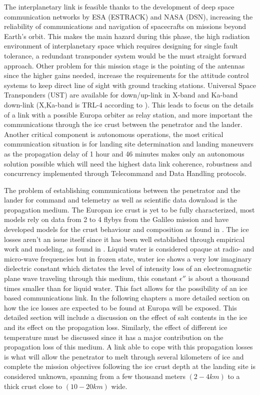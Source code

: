 The interplanetary link is feasible thanks to the development of deep space communication networks by ESA (ESTRACK) and NASA (DSN), increasing the reliability of communications and navigation of spacecrafts on missions beyond Earth's orbit. This makes the main hazard during this phase, the high radiation environment of interplanetary space which requires designing for single fault tolerance, a redundant transponder system would be the must straight forward approach. Other problem for this mission stage is the pointing of the antennas since the higher gains needed, increase the requirements for the attitude control systems to keep direct line of sight with ground tracking stations. Universal Space Transponders (UST) are available for down/up-link in X-band and Ka-band down-link (X,Ka-band is TRL-4 according to \cite{clipper}). This leads to focus on the details of a link with a possible Europa orbiter as relay station, and more important the communications through the ice crust between the penetrator and the lander. Another critical component is autonomous operations, the most critical communication situation is for landing site determination and landing maneuvers as the propagation delay of 1 hour and 46 minutes makes only an autonomous solution possible which will need the highest data link coherence, robustness and concurrency implemented through Telecommand and Data Handling protocols.

The problem of establishing communications between the penetrator and the lander for command and telemetry as well as scientific data download is the propagation medium. The Europan ice crust is yet to be fully characterized, most models rely on data from 2 to 4 flybys from the Galileo mission and have developed models for the crust behaviour and composition as found in \cite{Chyba}. The ice losses aren't an issue itself since it has been well established through empirical work and modeling, as found in \cite{iceLink-scott}. Liquid water is considered opaque at radio- and micro-wave frequencies but in frozen state, water ice shows a very low imaginary dielectric constant which dictates the level of intensity loss of an electromagnetic plane wave traveling through this medium, this constant $\epsilon''$ is about a thousand times smaller than for liquid water. This fact allows for the possibility of an ice based communications link. In the following chapters a more detailed section on how the ice losses are expected to be found at Europa will be exposed. This detailed section will include a discussion on the effect of salt contents in the ice and its effect on the propagation loss. Similarly, the effect of different ice temperature must be discussed since it has a major contribution on the propagation loss of this medium. A link able to cope with this propagation losses is what will allow the penetrator to melt through several kilometers of ice and complete the mission objectives following the ice crust depth at the landing site is considered unknown, spanning from a few thousand meters $(2-4 km)$ to a thick crust close to $(10-20 km)$ wide.


